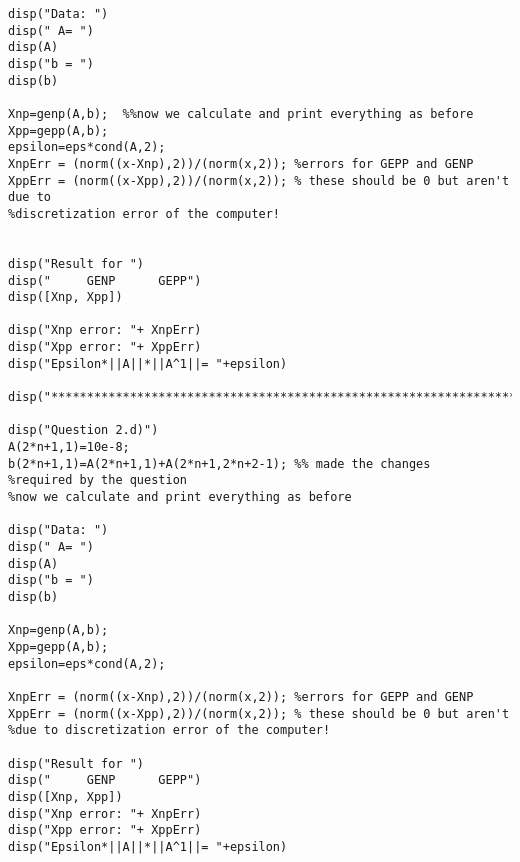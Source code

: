 \begin{enumerate}[1)]
\begin{enumerate}[(a)]
\begin{verbatim}
disp("Data: ")
disp(" A= ")
disp(A)
disp("b = ")
disp(b)

Xnp=genp(A,b);  %%now we calculate and print everything as before
Xpp=gepp(A,b); 
epsilon=eps*cond(A,2); 
XnpErr = (norm((x-Xnp),2))/(norm(x,2)); %errors for GEPP and GENP
XppErr = (norm((x-Xpp),2))/(norm(x,2)); % these should be 0 but aren't due to 
%discretization error of the computer!


disp("Result for ")
disp("     GENP      GEPP")
disp([Xnp, Xpp])

disp("Xnp error: "+ XnpErr)
disp("Xpp error: "+ XppErr)
disp("Epsilon*||A||*||A^1||= "+epsilon)

disp("*****************************************************************") 

disp("Question 2.d)")
A(2*n+1,1)=10e-8;
b(2*n+1,1)=A(2*n+1,1)+A(2*n+1,2*n+2-1); %% made the changes 
%required by the question
%now we calculate and print everything as before

disp("Data: ")
disp(" A= ")
disp(A)
disp("b = ")
disp(b)

Xnp=genp(A,b);  
Xpp=gepp(A,b); 
epsilon=eps*cond(A,2); 

XnpErr = (norm((x-Xnp),2))/(norm(x,2)); %errors for GEPP and GENP
XppErr = (norm((x-Xpp),2))/(norm(x,2)); % these should be 0 but aren't 
%due to discretization error of the computer!

disp("Result for ")
disp("     GENP      GEPP")
disp([Xnp, Xpp])
disp("Xnp error: "+ XnpErr)
disp("Xpp error: "+ XppErr)
disp("Epsilon*||A||*||A^1||= "+epsilon)


	\end{verbatim}
	
	\end{enumerate}
	
	

\end{enumerate}



